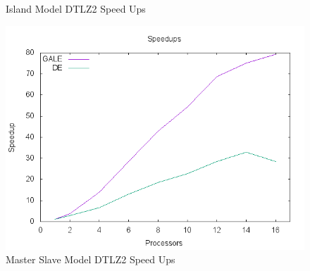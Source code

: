 \documentclass[conference]{IEEEtran}
\begin{document}
\begin{figure}[htbp]
\begin{minipage}{0.5\linewidth}
\begin{mdframed}
	\end{mdframed}
	\caption{Island Model DTLZ2 Speed Ups}	
	\label{fig:DTLZ2_island_speedups}
    \end{minipage}
    \begin{minipage}{0.5\linewidth}
    \centering
    \begin{mdframed}
		\includegraphics[width=\linewidth]{img/master-slave/dtlz2/speedups}
	\end{mdframed}
	\caption{Master Slave Model DTLZ2 Speed Ups}	
	\label{fig:DTLZ2_master_speedups}
    \end{minipage}
    \end{figure}
	
\end{document}
